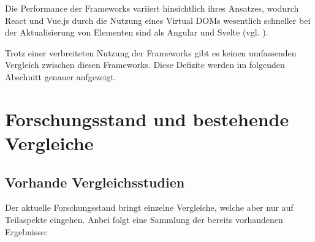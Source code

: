 \documentclass[oneside]{ausarbeitung}
\begin{document}
Die Performance der Frameworks variiert hinsichtlich ihres Ansatzes, wodurch React und Vue.js durch die Nutzung eines Virtual DOMs wesentlich schneller bei der Aktualisierung von Elementen sind als Angular und Svelte (vgl. \parencite[S. 61]{js-framework-comparison}).

Trotz einer verbreiteten Nutzung der Frameworks gibt es keinen umfassenden Vergleich zwischen diesen Frameworks. Diese Defizite werden im folgenden Abschnitt genauer aufgezeigt. 

\section{Forschungsstand und bestehende Vergleiche}
\subsection{Vorhande Vergleichsstudien}
Der aktuelle Forschungsstand bringt einzelne Vergleiche, welche aber nur auf Teilaspekte eingehen. Anbei folgt eine Sammlung der bereits vorhandenen Ergebnisse: 
\end{document}

